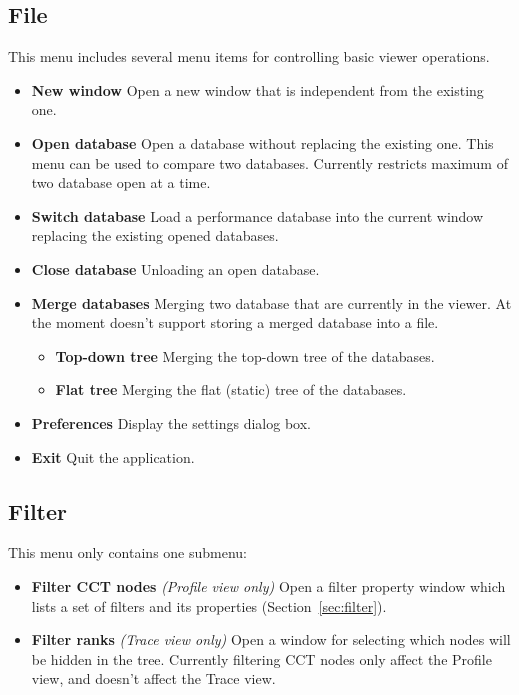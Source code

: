 \subsection{File}
This menu includes several menu items for controlling basic viewer operations.
\begin{itemize}
  \item \textbf{New window}
  Open a new \hpcviewer{} window that is independent from the existing one.

  \item \textbf{Open database}
  Open a database without replacing the existing one. This menu can be used to compare two databases.
  Currently \hpcviewer{} restricts maximum of two database open at a time. 

  \item \textbf{Switch database}
  Load a performance database into the current \hpcviewer{} window replacing the existing opened databases.

  \item \textbf{Close database}
  Unloading an open database.

  \item \textbf{Merge databases}
  Merging two database that are currently in the viewer. 
  At the moment \hpcviewer{} doesn't support storing a merged database into a file.
  \begin{itemize}
    \item \textbf{Top-down tree} Merging the top-down tree of the databases.
    \item \textbf{Flat tree}     Merging the flat (static) tree of the databases.
  \end{itemize}

  \item \textbf{Preferences}
  Display the settings dialog box.

  \item \textbf{Exit}
  Quit the \hpcviewer{} application.

\end{itemize}


\subsection{Filter}
This menu only contains one submenu:
\begin{itemize}
 \item \textbf{Filter CCT nodes}  \textit{(Profile view only)}
  Open a filter property window which lists a set of filters and its properties (Section~\ref{sec:filter}).

 \item \textbf{Filter ranks} \textit{(Trace view only)}
  Open a window for selecting which nodes will be hidden in the tree. 
  Currently filtering CCT nodes only affect the Profile view, and doesn't affect the Trace view.

\end{itemize}

